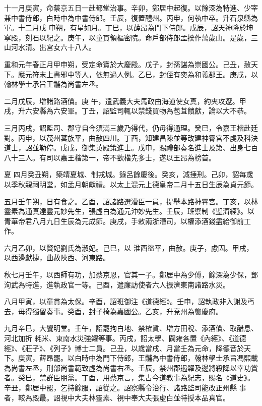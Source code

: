 \begin{pinyinscope}
 十一月庚寅，命蔡京五日一赴都堂治事。辛卯，鄭居中起復。以餘深為特進、少宰兼中書侍郎，白時中為中書侍郎。壬辰，復置醴州。丙申，何執中卒。升石泉縣為軍。十二月戊
 申朔，有星如月。丁巳，以薛昂為門下侍郎。戊辰，詔天神降於坤寧殿，刻石以紀之。庚午，以童貫領樞密院。命戶部侍郎孟揆作萬歲山。是歲，三山河水清。出宮女六十八人。



 重和元年春正月甲申朔，受定命寶於大慶殿。戊子，封孫諶為崇國公。己丑，赦天下。應元符末上書邪中等人，依無過人例。乙巳，封侄有奕為和義郡王。庚戌，以翰林學士承旨王黼為尚書左丞。



 二月戊辰，增諸路酒價。庚
 午，遣武義大夫馬政由海道使女真，約夾攻遼。甲戌，升六安縣為六安軍。丁丑，詔監司輒以禁錢買物為苞苴饋獻，論以大不恭。



 三月丙戌，詔監司、郡守自今須滿三歲乃得代，仍毋得通理。癸巳，令嘉王楷赴廷對。丙申，以茂州蕃族平，曲赦四川。丁酉，知建昌陳並等改建神霄宮不虔及科決道士，詔並勒停。戊戌，御集英殿策進士。戊申，賜禮部奏名進士及第、出身七百八十三人。有司以嘉王楷第一，帝不欲楷先多士，遂以王昂為榜首。



 夏
 四月癸丑朔，築靖夏城、制戎城。錄呂餘慶後。癸亥，減捶刑。己卯，詔每歲以季秋親祠明堂，如孟月朝獻禮。以太上混元上德皇帝二月十五日生辰為貞元節。



 五月壬午朔，日有食之。乙酉，詔諸路選漕臣一員，提舉本路神霄宮。丁亥，以林靈素為通真達靈元妙先生，張虛白為通元沖妙先生。壬辰，班禦制《聖濟經》。以青華帝君八月九日生辰為元成節。庚戌，手敕兩浙漕司，以權添酒錢盡給御前工作。



 六月乙卯，以賢妃劉氏為淑妃。己巳，以
 淮西盜平，曲赦。庚子，慮囚。甲戌，以西邊獻捷，曲赦陜西、河東路。



 秋七月壬午，以西師有功，加蔡京恩，官其一子。鄭居中為少傅，餘深為少保，鄧洵武為特進，進執政官一等。己酉，遣廉訪使者六人振濟東南諸路水災。



 八月甲寅，以童貫為太保。辛酉，詔班御注《道德經》。壬申，詔執政非入謝及丐去，毋得獨留奏事。癸酉，封子椅為嘉國公。乙亥，升兗州為襲慶府。



 九月辛巳，大饗明堂。壬午，詔罷拘白地、禁榷貨、增方田稅、添酒價、取醋息、河北加折
 耗米、東南水災強糴等事。丙戌，詔太學、闢雍各置《內經》、《道德經》、《莊子》、《列子》博士二員。己丑，以歲當戌、月當壬為元命，降德音於天下。庚寅，薛昂罷。以白時中為門下侍郎，王黼為中書侍郎，翰林學士承旨馮熙載為尚書左丞，刑部尚書範致虛為尚書右丞。壬辰，禁州郡遏糴及邊將殺降以幸功賞者。癸巳，禁群臣朋黨。丁酉，用蔡京言，集古今道教事為紀志，賜名《道史》。辛丑，鄭居中罷，乞持餘服，詔從之。詔察縣令治行、諸路監司能改正州縣
 事者，較為殿最。詔視中大夫林靈素、視中奉大夫張虛白並特授本品真官。




\end{pinyinscope}
